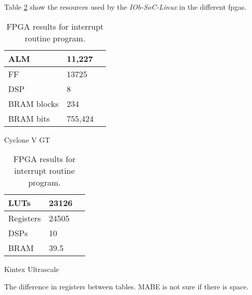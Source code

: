 Table \ref{tab:fpga_linux} show the resources used by the \textit{IOb-SoC-Linux} in the different \acrshort{fpga}s.

\begin{table}[!ht]
    \begin{subtable}[h]{0.45\textwidth}
        \centering
        \begin{tabular}{l|l|l|}
            \hline
            \multicolumn{1}{|l|}{ALM}         & 11,227  \\ \hline
            \multicolumn{1}{|l|}{FF}          & 13725   \\ \hline
            \multicolumn{1}{|l|}{DSP}         & 8       \\ \hline
            \multicolumn{1}{|l|}{BRAM blocks} & 234     \\ \hline
            \multicolumn{1}{|l|}{BRAM bits}   & 755,424 \\ \hline
        \end{tabular}
       \caption{Cyclone V GT}
       \label{tab:cyclone_linux}
    \end{subtable}
    \hfill
    \begin{subtable}[h]{0.45\textwidth}
        \centering
        \begin{tabular}{l|l|l|}
            \hline
            \multicolumn{1}{|l|}{LUTs}      & 23126 \\ \hline
            \multicolumn{1}{|l|}{Registers} & 24505 \\ \hline
            \multicolumn{1}{|l|}{DSPs}      & 10    \\ \hline
            \multicolumn{1}{|l|}{BRAM}      & 39.5  \\ \hline
        \end{tabular}
        \caption{Kintex Ultrascale}
        \label{tab:kintex_linux}
     \end{subtable}
     \caption{FPGA results for interrupt routine program.}
     \label{tab:fpga_linux}
\end{table}

The difference in registers between tables. MABE is not sure if there is space.
